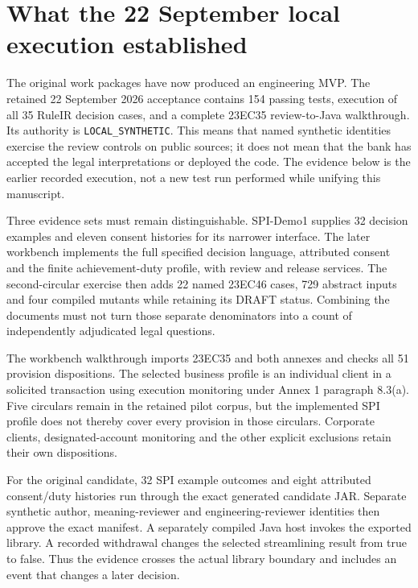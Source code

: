 \documentclass[12pt,a4paper,oneside,openany]{book}
\begin{document}
\section{What the 22 September local execution established}
\label{sec:executed-workbench}

The original work packages have now produced an engineering MVP. The retained
22 September 2026 acceptance contains 154 passing tests, execution of all
35 RuleIR decision cases, and a complete 23EC35 review-to-Java walkthrough.
Its authority is \texttt{LOCAL\_SYNTHETIC}. This means that named synthetic
identities exercise the review controls on public sources; it does not mean
that the bank has accepted the legal interpretations or deployed the code.
The evidence below is the earlier recorded execution, not a new test run
performed while unifying this manuscript.

Three evidence sets must remain distinguishable. SPI-Demo1 supplies 32 decision
examples and eleven consent histories for its narrower interface. The later
workbench implements the full specified decision language, attributed consent
and the finite achievement-duty profile, with review and release services.
The second-circular exercise then adds 22 named 23EC46 cases, 729 abstract
inputs and four compiled mutants while retaining its DRAFT status. Combining
the documents must not turn those separate denominators into a count of
independently adjudicated legal questions.

The workbench walkthrough imports 23EC35 and both annexes and checks all
51 provision dispositions. The selected business profile is an individual
client in a solicited transaction using execution monitoring under Annex 1
paragraph 8.3(a). Five circulars remain in the retained pilot corpus, but the
implemented SPI profile does not thereby cover every provision in those
circulars. Corporate clients, designated-account monitoring and the other
explicit exclusions retain their own dispositions.

For the original candidate, 32 SPI example outcomes and eight attributed
consent/duty histories run through the exact generated candidate JAR.
Separate synthetic author, meaning-reviewer and engineering-reviewer identities
then approve the exact manifest. A separately compiled Java host invokes the
exported library. A recorded withdrawal changes the selected streamlining
result from true to false. Thus the evidence crosses the actual library
boundary and includes an event that changes a later decision.
\end{document}
